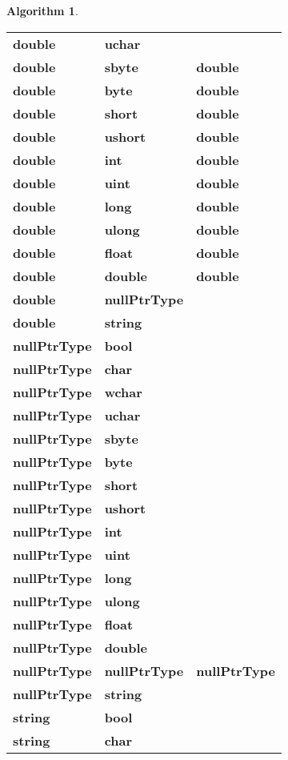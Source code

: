 \documentclass[a4paper,oneside,11pt]{book}
\theoremstyle{definition}
\newtheorem{algo}{Algorithm}[section]
\begin{document}
\begin{algo}
\begin{flushleft}
\begin{supertabular}{lll}
\textbf{double}& \textbf{uchar}& \\
\textbf{double}& \textbf{sbyte}& \textbf{double}\\
\textbf{double}& \textbf{byte}& \textbf{double}\\
\textbf{double}& \textbf{short}& \textbf{double}\\
\textbf{double}& \textbf{ushort}& \textbf{double}\\
\textbf{double}& \textbf{int}& \textbf{double}\\
\textbf{double}& \textbf{uint}& \textbf{double}\\
\textbf{double}& \textbf{long}& \textbf{double}\\
\textbf{double}& \textbf{ulong}& \textbf{double}\\
\textbf{double}& \textbf{float}& \textbf{double}\\
\textbf{double}& \textbf{double}& \textbf{double}\\
\textbf{double}& \textbf{nullPtrType}& \\
\textbf{double}& \textbf{string}& \\
\hline
\textbf{nullPtrType}& \textbf{bool}&\\
\textbf{nullPtrType}& \textbf{char}& \\
\textbf{nullPtrType}& \textbf{wchar}& \\
\textbf{nullPtrType}& \textbf{uchar}& \\
\textbf{nullPtrType}& \textbf{sbyte}& \\
\textbf{nullPtrType}& \textbf{byte}& \\
\textbf{nullPtrType}& \textbf{short}& \\
\textbf{nullPtrType}& \textbf{ushort}& \\
\textbf{nullPtrType}& \textbf{int}& \\
\textbf{nullPtrType}& \textbf{uint}& \\
\textbf{nullPtrType}& \textbf{long}& \\
\textbf{nullPtrType}& \textbf{ulong}& \\
\textbf{nullPtrType}& \textbf{float}& \\
\textbf{nullPtrType}& \textbf{double}& \\
\textbf{nullPtrType}& \textbf{nullPtrType}& \textbf{nullPtrType}\\
\textbf{nullPtrType}& \textbf{string}& \\
\hline
\textbf{string}& \textbf{bool}& \\
\textbf{string}& \textbf{char}& \\

\end{supertabular}
\end{flushleft}
\end{algo}
\end{document}
